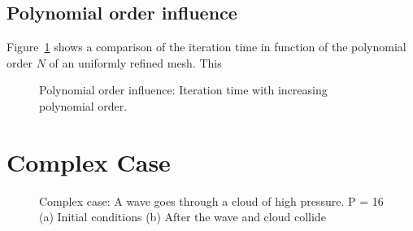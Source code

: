 \subsection{Polynomial order influence}\label{subsection:results:load_balancing_performance:polynomial_order}

Figure~\ref{fig:N_influence} shows a comparison of the iteration time in function of the polynomial
order \(N\) of an uniformly refined mesh. This

\begin{figure}[H]
	\centering
	
	\caption{Polynomial order influence: Iteration time with increasing polynomial order.}\label{fig:N_influence}
\end{figure}

\section{Complex Case}\label{section:results:complex_application}

\begin{figure}[H]
	\centering
	\hfill
	\caption{Complex case: A wave goes through a cloud of high pressure. P = 16 (a) Initial conditions (b) After the wave and cloud collide}\label{fig:cloud_p}
\end{figure}

